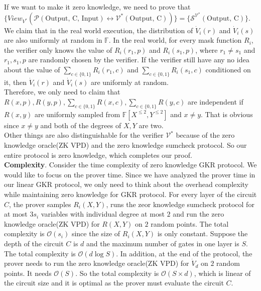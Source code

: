 If we want to make it zero knowledge, we need to prove that $\{View_{V^*}(\mathcal{P}(\text{Output, C, Input}) \leftrightarrow \mathcal{V^*}(\text{Output, C}))\} = \{\mathcal{S}^{\mathcal{V^*}}(\text{Output, C})\}$. We claim that in the real world execution, the distribution of $\dot{V}_i(r)$ and $\dot{V}_i(s)$ are also uniformly at random in $\mathbb{F}$. In the real world, for every mask function $R_i$, the verifier only knows the value of $R_i(r_1, p)$ and $R_i(s_1, p)$, where $r_1 \neq s_1$ and $r_1, s_1, p$ are randomly chosen by the verifier. If the verifier still have any no idea about the value of $\sum\limits_{c \in \{0, 1\}}R_i(r_1, c)$ and $\sum\limits_{c \in \{0, 1\}}R_i(s_1, c)$ conditioned on it, then $\dot{V}_i(r)$ and $\dot{V}_i(s)$ are uniformly at random.\\

Therefore, we only need to claim that $R(x, p), R(y, p), \sum\limits_{c \in \{0, 1\}}R(x, c), \sum\limits_{c \in \{0, 1\}}R(y, c)$ are independent if $R(x, y)$ are uniformly sampled from $\mathbb{F}[X^{\leqslant 2}, Y^{\leqslant 2}]$ and $x \neq y$. That is obvious since $x \neq y$ and both of the degrees of $X, Y$ are two.\\

Other things are also distinguishable for the verifier $\mathcal{V^*}$ because of the zero knowledge oracle(ZK VPD) and the zero knowledge sumcheck protocol. So our entire protocol is zero knowledge, which completes our proof.\\

\noindent
\textbf{Complexity}. Consider the time complexity of zero knowledge GKR protocol. We would like to focus on the prover time. Since we have analyzed the prover time in our linear GKR protocol, we only need to think about the overhead complexity while maintaining zero knowledge for GKR protocol. For every layer of the circuit $C$, the prover samples $R_i(X, Y)$, runs the zeor knowledge sumcheck protocol for at most $3s_i$ variables with individual degree at most $2$ and run the zero knowledge oracle(ZK VPD) for $R(X, Y)$ on $2$ random points. The total complexity is $\mathcal{O}(s_i)$ since the size of $R_i(X, Y)$ is only constant. Suppose the depth of the circuit $C$ is $d$ and the maximum number of gates in one layer is $S$. The total complexity is $\mathcal{O}(d \log S)$. In addition, at the end of the protocol, the prover needs to run the zero knowledge oracle(ZK VPD) for $\dot{V}_d$ on $2$ random points. It needs $\mathcal{O}(S)$. So the total complexity is $\mathcal{O}(S \times d)$, which is linear of the circuit size and it is optimal as the prover must evaluate the circuit $C$. 

